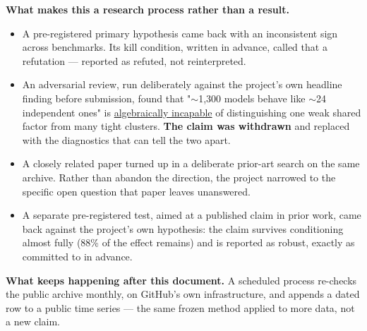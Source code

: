 \documentclass[10pt]{article}
\begin{document}
\vspace{4pt}
\noindent\textbf{What makes this a research process rather than a result.}
\begin{itemize}[leftmargin=14pt,itemsep=1pt,topsep=2pt]
\item A pre-registered primary hypothesis came back with an inconsistent sign across benchmarks.
Its kill condition, written in advance, called that a refutation --- reported as refuted, not
reinterpreted.
\item An adversarial review, run deliberately against the project's own headline finding before
submission, found that "$\sim$1{,}300 models behave like $\sim$24 independent ones" is
\href{https://github.com/SilverCoin256/cofail/blob/main/results/RESULTS_DIGEST.md}{algebraically
incapable} of distinguishing one weak shared factor from many tight clusters. \textbf{The claim
was withdrawn} and replaced with the diagnostics that can tell the two apart.
\item A closely related paper turned up in a deliberate prior-art search on the same archive.
Rather than abandon the direction, the project narrowed to the specific open question that paper
leaves unanswered.
\item A separate pre-registered test, aimed at a published claim in prior work, came back against
the project's own hypothesis: the claim survives conditioning almost fully (88\% of the effect
remains) and is reported as robust, exactly as committed to in advance.
\end{itemize}

\vspace{4pt}
\noindent\textbf{What keeps happening after this document.} A scheduled process re-checks the
public archive monthly, on GitHub's own infrastructure, and appends a dated row to a public time
series --- the same frozen method applied to more data, not a new claim.

\vspace{6pt}
\end{document}
